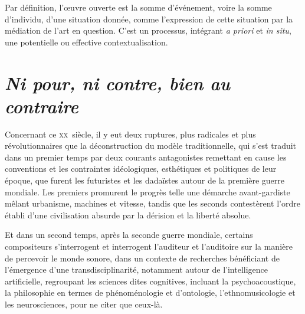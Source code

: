 \documentclass{article}
\begin{document}
Par définition, l'œuvre ouverte est la somme d'événement, voire la somme d'individu, d'une situation donnée, comme l'expression de cette situation par la médiation de l'art en question. C'est un processus, intégrant \textit{a priori} et \textit{in situ}, une potentielle ou effective contextualisation.




\section{\textit{Ni pour, ni contre, bien au contraire}}

Concernant ce \textsc{xx}\ieme ~siècle, il y eut deux ruptures, plus radicales et plus révolutionnaires que la déconstruction du modèle traditionnelle, %
qui s'est traduit dans un premier temps par deux courants antagonistes remettant en cause les conventions et les contraintes idéologiques, esthétiques et politiques de leur époque, que furent les futuristes %
et les dadaïstes autour de la première guerre mondiale. Les premiers promurent le progrès telle une démarche avant-gardiste mêlant urbanisme, machines et vitesse, tandis que les seconds contestèrent l'ordre établi d'une civilisation absurde par la dérision et la liberté absolue. 

Et dans un second temps, après la seconde guerre mondiale, certains compositeurs s'interrogent et interrogent l'auditeur et l'auditoire sur la manière de percevoir le monde sonore, dans un contexte de recherches bénéficiant de l'émergence d'une transdisciplinarité, notamment autour de l'intelligence artificielle, regroupant les sciences dites cognitives, incluant la psychoacoustique, la philosophie en termes de phénoménologie et d'ontologie, l'ethnomusicologie et les neurosciences, pour ne citer que ceux-là.
\end{document}

